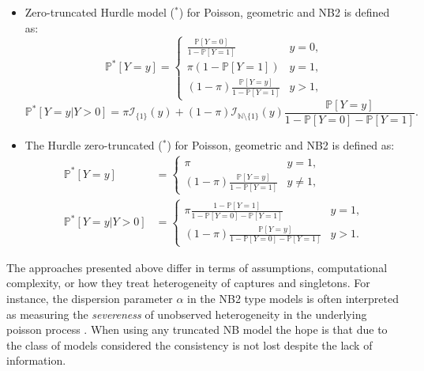 \documentclass[
]{jss}
\newcommand{\1}{\mathcal{I}} \newcommand{\bZero}{\boldsymbol{0}}
\begin{document}
\begin{itemize}
    \item Zero-truncated Hurdle model ($^\ast$) for Poisson, geometric and NB2 is defined as:
    \begin{equation*}
        \mathbb{P}^{\ast}[Y=y]=\begin{cases}
        \frac{\mathbb{P}[Y=0]}{1-\mathbb{P}[Y=1]} & y=0, \\
        \pi(1-\mathbb{P}[Y=1]) & y=1, \\
        (1-\pi) \frac{\mathbb{P}[Y=y]}{1-\mathbb{P}[Y=1]} & y>1,
        \end{cases}
    \end{equation*}
    \begin{equation*}
        \mathbb{P}^{\ast}[Y=y|Y>0]=\pi\mathcal{I}_{\{1\}}(y)+
        (1-\pi)\mathcal{I}_{\mathbb{N}\setminus\{1\}}(y)\frac{\mathbb{P}[Y=y]}{1-\mathbb{P}[Y=0]-\mathbb{P}[Y=1]}.
    \end{equation*}
    \item The Hurdle zero-truncated ($^\ast$) for Poisson, geometric and NB2 is defined as:
    \begin{align*}
        \mathbb{P}^{\ast}[Y=y]&=\begin{cases}
        \pi & y=1, \\
        (1-\pi) \frac{\mathbb{P}[Y=y]}{1-\mathbb{P}[Y=1]} & y\neq1,
        \end{cases}\\
        \mathbb{P}^{\ast}[Y=y|Y>0]&=\begin{cases}
            \pi\frac{1-\mathbb{P}[Y=1]}{1-\mathbb{P}[Y=0]-\mathbb{P}[Y=1]} & y=1,\\
            (1-\pi)\frac{\mathbb{P}[Y=y]}{1-\mathbb{P}[Y=0]-\mathbb{P}[Y=1]} & y>1.
        \end{cases}
    \end{align*}
\end{itemize}

The approaches presented above differ in terms of assumptions,
computational complexity, or how they treat heterogeneity of captures
and singletons. For instance, the dispersion parameter \(\alpha\) in the
NB2 type models is often interpreted as measuring the
\textit{severeness} of unobserved heterogeneity in the underlying
poisson process \citep[cf.][]{ztnegbin}. When using any truncated NB
model the hope is that due to the class of models considered the
consistency is not lost despite the lack of information.
\end{document}
